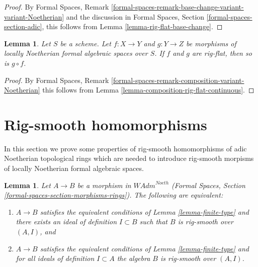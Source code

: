 \documentclass{stacks-project}
\theoremstyle{plain}
\newtheorem{lemma}[subsection]{Lemma}
\theoremstyle{definition}
\theoremstyle{remark}
\numberwithin{equation}{subsection}
\begin{document}
\begin{proof}
By Formal Spaces, Remark
\ref{formal-spaces-remark-base-change-variant-variant-Noetherian}
and the discussion in Formal Spaces, Section
\ref{formal-spaces-section-adic},
this follows from
Lemma \ref{lemma-rig-flat-base-change}.
\end{proof}

\begin{lemma}
\label{lemma-composition-rig-flat}
Let $S$ be a scheme. Let $f : X \to Y$ and $g : Y \to Z$
be morphisms of locally Noetherian formal algebraic spaces over $S$.
If $f$ and $g$ are rig-flat, then so is $g \circ f$.
\end{lemma}

\begin{proof}
By Formal Spaces, Remark
\ref{formal-spaces-remark-composition-variant-Noetherian}
this follows from Lemma \ref{lemma-composition-rig-flat-continuous}.
\end{proof}










\section{Rig-smooth homomorphisms}
\label{section-rig-smooth-homomorphisms}

\noindent
In this section we prove some properties of
rig-smooth homomorphisms of adic Noetherian
topological rings which are needed to introduce
rig-smooth morpisms of locally Noetherian
formal algebraic spaces.

\begin{lemma}
\label{lemma-rig-smooth-continuous}
Let $A \to B$ be a morphism in $\textit{WAdm}^{Noeth}$
(Formal Spaces, Section \ref{formal-spaces-section-morphisms-rings}).
The following are equivalent:
\begin{enumerate}
\item[(a)] $A \to B$ satisfies the equivalent conditions of
Lemma \ref{lemma-finite-type} and there exists an ideal of definition
$I \subset B$ such that $B$ is rig-smooth over $(A, I)$, and
\item[(b)] $A \to B$ satisfies the equivalent conditions of
Lemma \ref{lemma-finite-type} and for all ideals of definition
$I \subset A$ the algebra $B$ is rig-smooth over $(A, I)$.
\end{enumerate}
\end{lemma}
\end{document}
